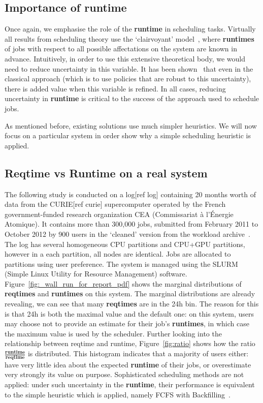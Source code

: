 \documentclass{article}
\begin{document}
\subsection{Importance of \textbf{runtime}}
\label{sub:importance_of_runtime}
Once again, we emphasise the role of the \textbf{runtime} in scheduling tasks. Virtually all results from scheduling theory use the `clairvoyant' model~\cite{handbook-of-scheduling}, where \textbf{runtimes} of jobs with respect to all possible affectations on the system are known in advance.
Intuitively, in order to use this extensive theoretical body, we would need to reduce uncertainty in this variable.
It has been shown~\cite{tsafir} that even in the classical approach (which is to use policies that are robust to this uncertainty), there is added value when this variable is refined.
In all cases, reducing uncertainty in \textbf{runtime} is critical to the success of the approach used to schedule jobs.

As mentioned before, existing solutions use much simpler heuristics. We will now focus on a particular system in order show why a simple scheduling heuristic is applied.

\subsection{Reqtime vs Runtime on a real system}
\label{sub:reqtime_vs_runtime_on_a_real_system}
The following study is conducted on a log[ref log] containing 20 months worth of data from the CURIE[ref curie] supercomputer operated by the French government-funded research organization CEA (Commissariat à l'Énergie Atomique).
It contains more than 300,000 jobs, submitted from February 2011 to October 2012 by 900 users in the `cleaned' version from the workload archive~\cite{workloadarchive}.
The log has several homogeneous CPU partitions and CPU+GPU partitions, however in a each partition, all nodes are identical.
Jobs are allocated to partitions using user preference. The system is managed using the SLURM (Simple Linux Utility for Resource Management) software.
Figure~\ref{fig:_wall_run_for_report_pdf} shows the marginal distributions of \textbf{reqtimes} and \textbf{runtimes} on this system. The marginal distributions are already revealing, we can see that many \textbf{reqtimes} are in the 24h bin.
The reason for this is that 24h is both the maximal value and the default one: on this system, users may choose not to provide an estimate for their job's \textbf{runtimes}, in which case the maximum value is used by the scheduler.
Further looking into the relationship between reqtime and runtime, Figure~\ref{fig:ratio} shows how the ratio $\frac{\textbf{runtime}}{\textbf{reqtime}}$ is distributed. This histogram indicates that a majority of users either: have very little idea about the expected \textbf{runtime} of their jobs, or overestimate very strongly its value on purpose. Sophisticated scheduling methods are not applied: under such uncertainty in the \textbf{runtime},  their performance is equivalent to the simple heuristic which is applied, namely FCFS with Backfilling~\cite{backfilling}.
\end{document}
